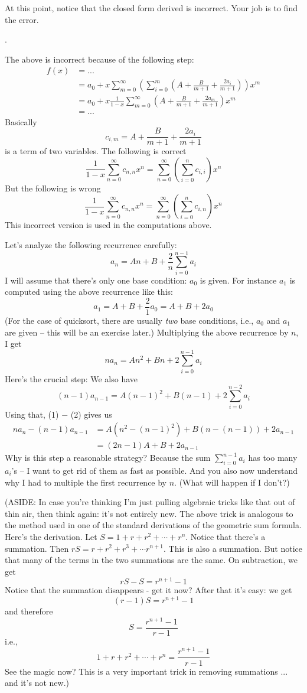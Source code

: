 At this point, notice that the closed form derived is incorrect.
Your job is to find the error.


\SOLUTION.

The above is incorrect because of the following step:
\begin{align*}
  f(x) &= ... \\
&= a_0 +
   x
   \sum_{m=0}^\infty
   \left(
     \sum_{i=0}^{m} \left( A + \frac{B}{m+1} + \frac{2a_i}{m+1} \right)
   \right) x^{m}
   \\
&= a_0 +
   x
   \frac{1}{1 - x}
   \sum_{m=0}^\infty
     \left( A + \frac{B}{m+1} + \frac{2a_m}{m+1} \right)
     x^{m}
   \\
&= ...
\end{align*}
Basically 
\[
c_{i,m} = A + \frac{B}{m+1} + \frac{2a_i}{m+1}
\]
is a term of two variables.
The following is correct
\[
\frac{1}{1-x}
\sum_{n=0}^\infty c_{n,n} x^n
=
\sum_{n=0}^\infty
\left(
  \sum_{i = 0}^n c_{i,i}
\right) x^n
\]
But the following is wrong
\[
\frac{1}{1 - x}
\sum_{n=0}^\infty c_{n,n} x^n
=
\sum_{n=0}^\infty
  \left(
  \sum_{i=0}^n c_{i,n}
  \right) x^n
\]
This incorrect version is used in the computations above.


\newpage
Let's analyze the following recurrence carefully:
\[
a_n = An + B + \frac{2}{n} \sum_{i=0}^{n-1} a_i
\]
I will assume that there's only one base condition: $a_0$ is given.
For instance $a_1$ is computed using the above recurrence like this:
\[
a_1 = A + B + \frac{2}{1} a_0 = A + B + 2 a_0
\]
(For the case of quicksort, there are usually \textit{two} base conditions, i.e., $a_0$
and $a_1$ are given -- this will be an exercise later.)
Multiplying the above recurrence by $n$, I get 
\[
na_n = An^2 + Bn + 2 \sum_{i=0}^{n-1} a_i \tag{1}
\]
Here's the crucial step:
We also have
\[
(n-1)a_{n-1} = A(n-1)^2 + B(n-1) + 2 \sum_{i=0}^{n-2} a_i \tag{2}
\]
Using that, (1) $-$ (2) gives us
\begin{align*}
na_n - (n-1)a_{n-1}
&= A(n^2 - (n-1)^2) + B(n - (n-1)) + 2a_{n-1} \\
&= (2n - 1) A + B + 2a_{n-1}
\end{align*}
Why is this step a reasonable strategy?
Because the sum $\sum_{i=0}^{n-1} a_i$ has too many $a_i$'s -- I want to get rid of them as fast
as possible.
And you also now understand why I had to multiple the first recurrence by
$n$. (What will happen if I don't?)

(ASIDE:
In case you're thinking I'm just pulling algebraic tricks like that
out of thin air, then think again: it's not entirely new.
The above trick is analogous to the method used in
one of the standard derivations of the geometric sum formula.
Here's the derivation.
Let $S = 1 + r + r^2 + \cdots + r^n$. Notice that there's a summation.
Then $rS = r + r^2 + r^3 + \cdots r^{n+1}$.
This is also a summation.
But notice that many of the terms in the two summations are the same.
On subtraction, we get
\[
rS - S = r^{n+1} - 1
\]
Notice that the summation disappears - get it now?
After that it's easy: we get
\[
(r-1)S = r^{n+1} - 1
\]
and therefore
\[
S = \frac{r^{n+1} - 1}{r - 1}
\]
i.e.,
\[
1 + r + r^2 + \cdots + r^n = \frac{r^{n+1} - 1}{r - 1}
\]
See the magic now?
This is a very important trick in removing summations ... and it's not new.)

